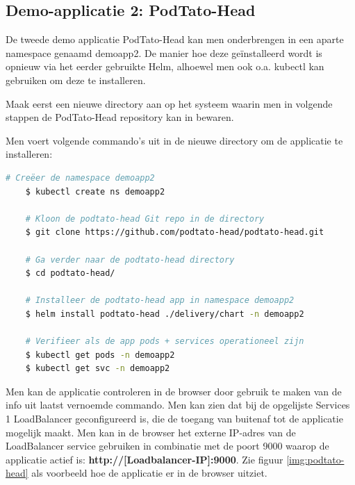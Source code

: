 \subsection{Demo-applicatie 2: PodTato-Head}

De tweede demo applicatie PodTato-Head kan men onderbrengen in een aparte namespace genaamd demoapp2. De manier hoe deze geïnstalleerd wordt is opnieuw via het eerder gebruikte Helm, alhoewel men ook o.a. kubectl kan gebruiken om deze te installeren. \autocite{Gavant2022}

Maak eerst een nieuwe directory aan op het systeem waarin men in volgende stappen de PodTato-Head repository kan in bewaren. 

Men voert volgende commando's uit in de nieuwe directory om de applicatie te installeren:
\begin{lstlisting}[language=bash]
    # Creëer de namespace demoapp2
    $ kubectl create ns demoapp2
    
    # Kloon de podtato-head Git repo in de directory
    $ git clone https://github.com/podtato-head/podtato-head.git
    
    # Ga verder naar de podtato-head directory
    $ cd podtato-head/
    
    # Installeer de podtato-head app in namespace demoapp2
    $ helm install podtato-head ./delivery/chart -n demoapp2 
    
    # Verifieer als de app pods + services operationeel zijn
    $ kubectl get pods -n demoapp2
    $ kubectl get svc -n demoapp2
\end{lstlisting} 

Men kan de applicatie controleren in de browser door gebruik te maken van de info uit laatst vernoemde commando. Men kan zien dat bij de opgelijste Services 1 LoadBalancer geconfigureerd is, die de toegang van buitenaf tot de applicatie mogelijk maakt. Men kan in de browser het externe IP-adres van de LoadBalancer service gebruiken in combinatie met de poort 9000 waarop de applicatie actief is: {\bf http://[Loadbalancer-IP]:9000}. \newline Zie figuur \ref{img:podtato-head} als voorbeeld hoe de applicatie er in de browser uitziet. 

